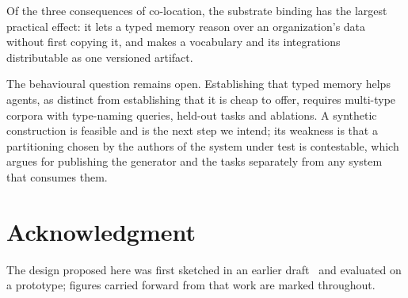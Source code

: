 \documentclass[journal,nofonttune]{IEEEtran}
\begin{document}
Of the three consequences of co-location, the substrate binding has the
largest practical effect: it lets a typed memory reason over an
organization's data without first copying it, and makes a vocabulary and its
integrations distributable as one versioned artifact.

The behavioural question remains open. Establishing that typed memory helps
agents, as distinct from establishing that it is cheap to offer, requires
multi-type corpora with type-naming queries, held-out tasks and ablations. A
synthetic construction is feasible and is the next step we intend; its
weakness is that a partitioning chosen by the authors of the system under
test is contestable, which argues for publishing the generator and the tasks
separately from any system that consumes them.

\section*{Acknowledgment}
The design proposed here was first sketched in an earlier
draft~\cite{predecessor} and evaluated on a prototype; figures carried
forward from that work are marked throughout.

\balance


\end{document}
